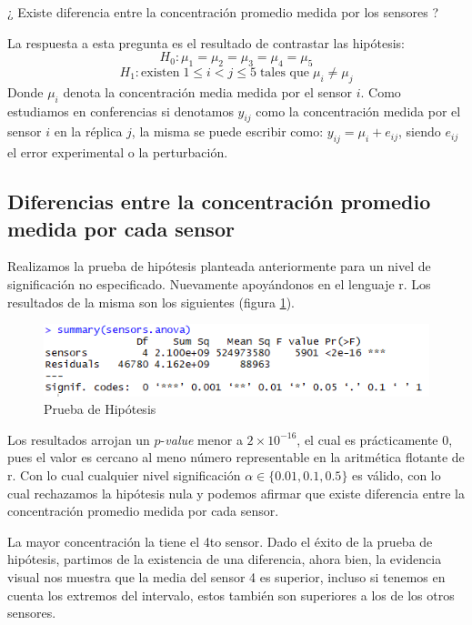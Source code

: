 \documentclass[a4paper,10pt,twocolumn]{article}
\begin{document}
 ¿ Existe diferencia entre la concentración promedio medida por los sensores ?
 
 La respuesta a esta pregunta es el resultado de contrastar las hipótesis:
 $$H_0: \mu_1 = \mu_2 = \mu_3 = \mu_4 = \mu_5 $$
 $$H_1: \mbox{existen}\; 1 \le i < j \le 5 \;\mbox{tales que}\; \mu_i \ne \mu_j $$
 Donde $\mu_i$ denota la concentración media medida por el sensor $i$. Como estudiamos en conferencias si denotamos $y_{ij}$ como la concentración medida por el sensor $i$ en la r\'eplica $j$, la misma se puede escribir como: $y_{ij} = \mu_i + e_{ij}$, siendo $e_{ij}$ el error experimental o la perturbaci\'on.
 
 \subsection{Diferencias entre la concentración promedio medida	por cada sensor}
 
 Realizamos la prueba de hip\'otesis planteada anteriormente para un nivel de significaci\'on no especificado. 
 Nuevamente apoy\'andonos en el lenguaje r. Los resultados de la misma son los siguientes (figura \ref{fig:anova}).
 
 \begin{figure}[h!]
 	\centering
 	\includegraphics[width=\linewidth]{Images/anova_summary.png}
 	\caption{Prueba de Hip\'otesis}
 	\label{fig:anova}
 \end{figure}
 
 Los resultados arrojan un $p$-\textit{value} menor a $2 \times 10^{-16}$, el cual es prácticamente $0$, pues el valor
 es cercano al meno n\'umero representable en la aritm\'etica flotante de r. Con lo cual cualquier nivel
 significaci\'on $\alpha \in \{0.01, 0.1, 0.5\}$ es v\'alido, con lo cual rechazamos la hip\'otesis nula y podemos afirmar que existe diferencia entre la concentración promedio medida por cada sensor.
 
 La mayor concentraci\'on la tiene el 4to sensor. Dado el \'exito de la prueba de hip\'otesis, partimos de
 la existencia de una diferencia, ahora bien, la evidencia visual nos muestra que la media del sensor 4 es superior, incluso si tenemos en cuenta los extremos del intervalo, estos tambi\'en son
 superiores a los de los otros sensores.
 
\end{document}
